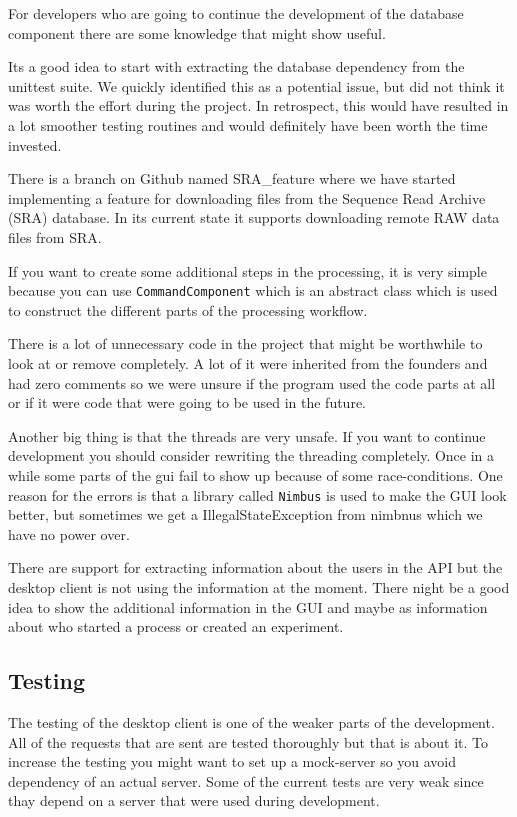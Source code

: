 For developers who are going to continue the development of the database component there are some knowledge that might show useful.

Its a good idea to start with extracting the database dependency from the unittest suite. We quickly identified this as a potential issue, but did not think it was worth the effort during the project. In retrospect, this would have resulted in a lot smoother testing routines and would definitely have been worth the time invested.

There is a branch on Github named SRA_feature where we have started implementing a feature for downloading files from the Sequence Read Archive (SRA) database. In its current state it supports downloading remote RAW data files from SRA.


















If you want to create some additional steps in the processing, it is very simple because you can use \texttt{CommandComponent} which is an abstract class which is used to construct the different parts of the processing workflow.

There is a lot of unnecessary code in the project that might be worthwhile to look at or remove completely. A lot of it were inherited from the founders and had zero comments so we were unsure if the program used the code parts at all or if it were code that were going to be used in the future.

Another big thing is that the threads are very unsafe. If you want to continue development you should consider rewriting the threading completely. Once in a while some parts of the gui fail to show up because of some race-conditions. One reason for the errors is that a library called \texttt{Nimbus} is used to make the GUI look better, but sometimes we get a IllegalStateException from nimbnus which we have no power over.

 There are support for extracting information about the users in the API but the desktop client is not using the information at the moment. There night be a good idea to show the additional information in the GUI and maybe as information about who started a process or created an experiment.

\subsection{Testing}
The testing of the desktop client is one of the weaker parts of the development. All of the requests that are sent are tested thoroughly but that is about it. To increase the testing you might want to set up a mock-server so you avoid dependency of an actual server. Some of the current tests are very weak since thay depend on a server that were used during development. 
